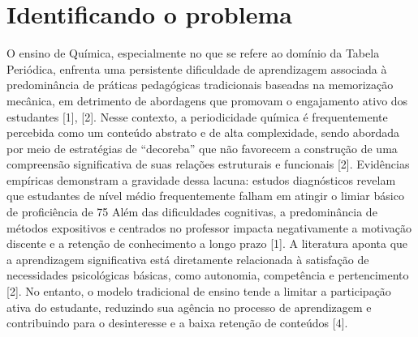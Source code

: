 \section{Identificando o problema}
O ensino de Química, especialmente no que se refere ao domínio da Tabela Periódica, enfrenta uma persistente dificuldade de aprendizagem associada à predominância de práticas pedagógicas tradicionais baseadas na memorização mecânica, em detrimento de abordagens que promovam o engajamento ativo dos estudantes [1], [2]. Nesse contexto, a periodicidade química é frequentemente percebida como um conteúdo abstrato e de alta complexidade, sendo abordada por meio de estratégias de “decoreba” que não favorecem a construção de uma compreensão significativa de suas relações estruturais e funcionais [2].
Evidências empíricas demonstram a gravidade dessa lacuna: estudos diagnósticos revelam que estudantes de nível médio frequentemente falham em atingir o limiar básico de proficiência de 75%
Além das dificuldades cognitivas, a predominância de métodos expositivos e centrados no professor impacta negativamente a motivação discente e a retenção de conhecimento a longo prazo [1]. A literatura aponta que a aprendizagem significativa está diretamente relacionada à satisfação de necessidades psicológicas básicas, como autonomia, competência e pertencimento [2]. No entanto, o modelo tradicional de ensino tende a limitar a participação ativa do estudante, reduzindo sua agência no processo de aprendizagem e contribuindo para o desinteresse e a baixa retenção de conteúdos [4]. 
